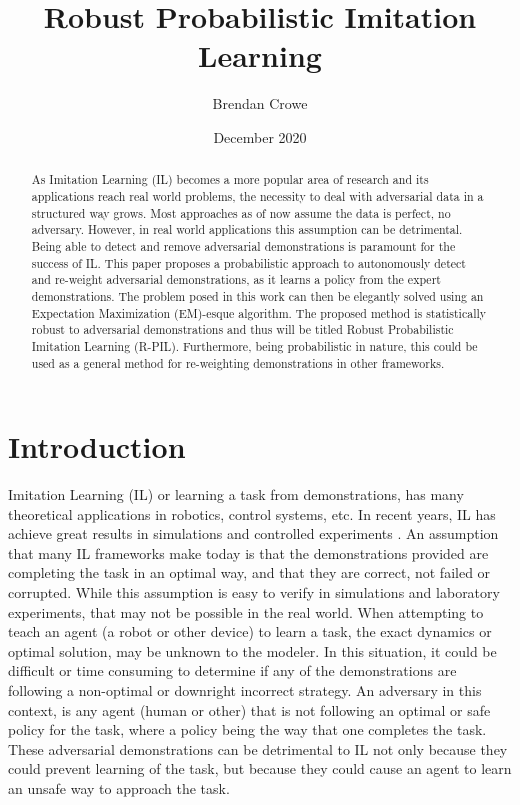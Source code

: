 \documentclass[11pt]{article}
\title{Robust Probabilistic Imitation Learning}
\author{Brendan Crowe}
\date{December 2020}
\begin{document}
\maketitle

\begin{abstract}
    As Imitation Learning (IL) becomes a more popular area of research and its applications reach real world problems, the necessity to deal with adversarial data in a structured way grows. Most approaches as of now assume the data is perfect, no adversary. However, in real world applications this assumption can be detrimental. Being able to detect and remove adversarial demonstrations is paramount for the success of IL. This paper proposes a probabilistic approach to autonomously detect and re-weight adversarial demonstrations, as it learns a policy from the expert demonstrations. The problem posed in this work can then be elegantly solved using an Expectation Maximization (EM)-esque algorithm. The proposed method is statistically robust to adversarial demonstrations and thus will be titled Robust Probabilistic Imitation Learning (R-PIL). Furthermore, being probabilistic in nature, this could be used as a general method for re-weighting demonstrations in other frameworks.
\end{abstract}

\section{Introduction}

\quad Imitation Learning (IL) or learning a task from demonstrations, has many theoretical applications in robotics, control systems, etc. In recent years, IL has achieve great results in simulations and controlled experiments \cite{ho2016generative} \cite{ramachandran2007bayesian}. An assumption that many IL frameworks make today is that the demonstrations provided are completing the task in an optimal way, and that they are correct, not failed or corrupted. While this assumption is easy to verify in simulations and laboratory experiments, that may not be possible in the real world. When attempting to teach an agent (a robot or other device) to learn a task, the exact dynamics or optimal solution, may be unknown to the modeler. In this situation, it could be difficult or time consuming to determine if any of the demonstrations are following a non-optimal or downright incorrect strategy. An adversary in this context, is any agent (human or other) that is not following an optimal or safe policy for the task, where a policy being the way that one completes the task. These adversarial demonstrations can be detrimental to IL not only because they could prevent learning of the task, but because they could cause an agent to learn an unsafe way to approach the task.
\end{document}
